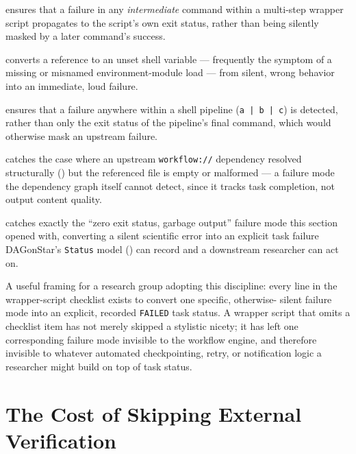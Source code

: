 \begin{description}[leftmargin=2em, style=nextline]
  \item[\texttt{set -e}] ensures that a failure in any \emph{intermediate}
    command within a multi-step wrapper script propagates to the script's
    own exit status, rather than being silently masked by a later command's
    success.
  \item[\texttt{set -u}] converts a reference to an unset shell variable ---
    frequently the symptom of a missing or misnamed environment-module load
    --- from silent, wrong behavior into an immediate, loud failure.
  \item[\texttt{set -o pipefail}] ensures that a failure anywhere within a
    shell pipeline (\texttt{a | b | c}) is detected, rather than only the
    exit status of the pipeline's final command, which would otherwise mask
    an upstream failure.
  \item[Input existence/non-emptiness validation] catches the case where an
    upstream \texttt{workflow://} dependency resolved structurally
    () but the referenced file is empty or malformed ---
    a failure mode the dependency graph itself cannot detect, since it
    tracks task completion, not output content quality.
  \item[Output existence/non-emptiness validation] catches exactly the
    ``zero exit status, garbage output'' failure mode this section opened
    with, converting a silent scientific error into an explicit task
    failure DAGonStar's \texttt{Status} model () can
    record and a downstream researcher can act on.
\end{description}

\begin{practicebox}
A useful framing for a research group adopting this discipline: every line
in the wrapper-script checklist exists to convert one specific, otherwise-
silent failure mode into an explicit, recorded \texttt{FAILED} task status.
A wrapper script that omits a checklist item has not merely skipped a
stylistic nicety; it has left one corresponding failure mode invisible to
the workflow engine, and therefore invisible to whatever automated
checkpointing, retry, or notification logic a researcher might build on top
of task status.
\end{practicebox}

\section{The Cost of Skipping External Verification}

